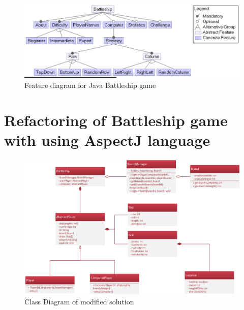 \documentclass[11pt,slovak,a4paper,twoside]{article}
\begin{document}
\begin{figure}[t]  %
					\begin{center}
									\includegraphics[width=\linewidth]{fig/battleshipFeatureModel.png}
									\caption{Feature diagram for Java Battleship game}
									\label{battleshipFeatureModel}
					\end{center}
\end{figure}


\section{Refactoring of Battleship game with using AspectJ language} \label{gameRefactoring}


\begin{figure}[t]  %
					\begin{center}
									\includegraphics[width=\linewidth]{fig/refactoredSchema.png}
									\caption{Class Diagram of modified solution}
									\label{refactoredSchema}
					\end{center}
\end{figure}
\end{document}

